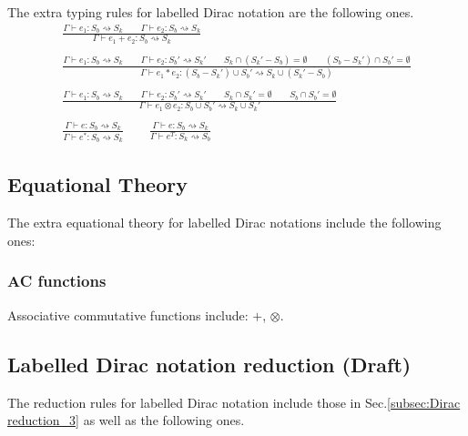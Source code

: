 \begin{definition}
 The extra typing rules for labelled Dirac notation are the following ones.
  \begin{gather*}
    \frac{\Gamma \vdash e_1 : S_b \rightsquigarrow S_k \qquad \Gamma \vdash e_2 : S_b \rightsquigarrow S_k}{\Gamma \vdash e_1 + e_2 : S_b \rightsquigarrow S_k}\\
    \ \\
    \frac{\Gamma \vdash e_1 : S_b \rightsquigarrow S_k \qquad \Gamma \vdash e_2 : S_b' \rightsquigarrow S_k'
    \qquad S_k \cap (S_k' - S_b) = \emptyset
    \qquad (S_b - S_k') \cap S_b' = \emptyset}
    {\Gamma \vdash e_1 * e_2 : (S_b - S_k') \cup S_b' \rightsquigarrow S_k \cup (S_k' - S_b)}\\
    \ \\
    \frac{\Gamma \vdash e_1 : S_b \rightsquigarrow S_k \qquad \Gamma \vdash e_2 : S_b' \rightsquigarrow S_k'
    \qquad S_k \cap S_k' = \emptyset
    \qquad S_b \cap S_b' = \emptyset}
    {\Gamma \vdash e_1 \otimes e_2 : S_b \cup S_b' \rightsquigarrow S_k \cup S_k'}\\
    \ \\
    \frac{\Gamma \vdash e : S_b \rightsquigarrow S_k}{\Gamma \vdash e^* : S_b \rightsquigarrow S_k}
    \qquad
    \frac{\Gamma \vdash e : S_b \rightsquigarrow S_k}{\Gamma \vdash e^T : S_k \rightsquigarrow S_b}
  \end{gather*}
\end{definition}

\subsection{Equational Theory}
The extra equational theory for labelled Dirac notations include the following ones:

\subsubsection*{AC functions}
Associative commutative functions include: $+$, $\otimes$.

\subsection{Labelled Dirac notation reduction (Draft)}

  The reduction rules for labelled Dirac notation include those in Sec.\ref{subsec:Dirac reduction_3} as well as the following ones.

